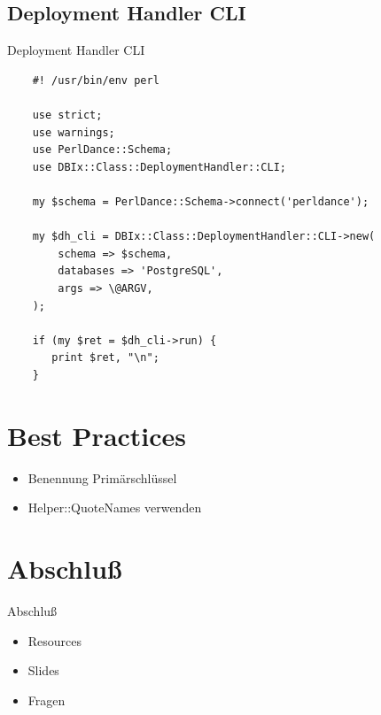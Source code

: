 \subsection{Deployment Handler CLI}

\begin{frame}[fragile]{Deployment Handler CLI}
\begin{lstlisting}
    #! /usr/bin/env perl

    use strict;
    use warnings;
    use PerlDance::Schema;
    use DBIx::Class::DeploymentHandler::CLI;

    my $schema = PerlDance::Schema->connect('perldance');

    my $dh_cli = DBIx::Class::DeploymentHandler::CLI->new(
        schema => $schema,
        databases => 'PostgreSQL',
        args => \@ARGV,
    );

    if (my $ret = $dh_cli->run) {
       print $ret, "\n";
    }
\end{lstlisting}
\end{frame}

\section{Best Practices}

\begin{itemize}
\item Benennung Primärschlüssel
\item Helper::QuoteNames verwenden
\end{itemize}

\section{Abschluß}

\begin{frame}{Abschluß}
\begin{itemize}
\item Resources
\item Slides
\item Fragen
\end{itemize}
\end{frame}

